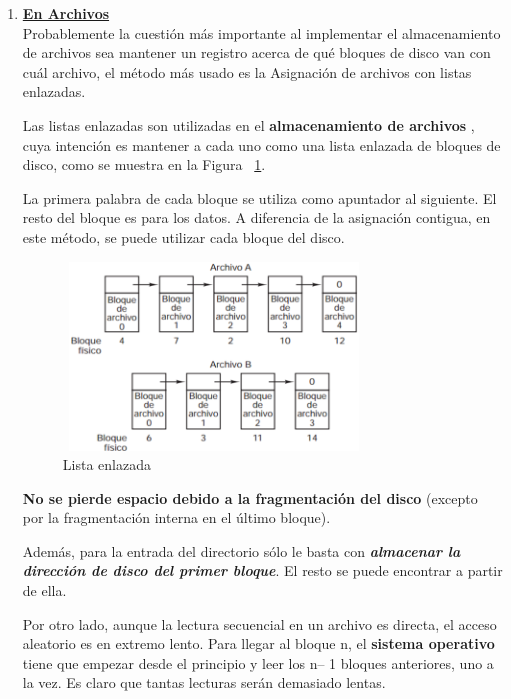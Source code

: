 \documentclass[10pt,journal]{IEEEtran}
\begin{document}
    \begin{enumerate}
    \item \underline{\textbf{En Archivos}} \\
    Probablemente la cuestión más importante al implementar el almacenamiento de archivos sea mantener un registro acerca de qué bloques de disco van con cuál archivo, el método más usado es la Asignación de archivos con listas enlazadas.

    Las listas enlazadas son utilizadas en el \textbf{almacenamiento de archivos} \cite{enlazada18:online}, cuya intención es mantener a cada uno como una lista enlazada de bloques de disco, como se muestra en la Figura  ~\ref{f33}.
    
     La primera palabra de cada bloque se utiliza como apuntador al siguiente. El resto del bloque es para los datos. A diferencia de la asignación contigua, en este método, se puede utilizar cada bloque del disco.
    
     \begin{figure}[H]
        \begin{center}
        \includegraphics[width=8cm, height=5cm]{Imagenes/Archivo1.png}
        \caption{Lista enlazada}
        \label{f33} 
        \end{center}
    \end{figure}
    
    \textbf{No se pierde espacio debido a la fragmentación del disco} (excepto por la fragmentación interna en el último bloque).
    
    Además, para la entrada del directorio sólo le basta con \textbf{\textit{almacenar la dirección de disco del primer bloque}}. El resto se puede encontrar a partir de ella.

    Por otro lado, aunque la lectura secuencial en un archivo es directa, el acceso aleatorio es en extremo lento. Para llegar al bloque n, el \textbf{sistema operativo} tiene que empezar desde el principio y leer los n– 1 bloques anteriores, uno a la vez. Es claro que tantas lecturas serán demasiado lentas.
    

\end{enumerate}
\end{document}
